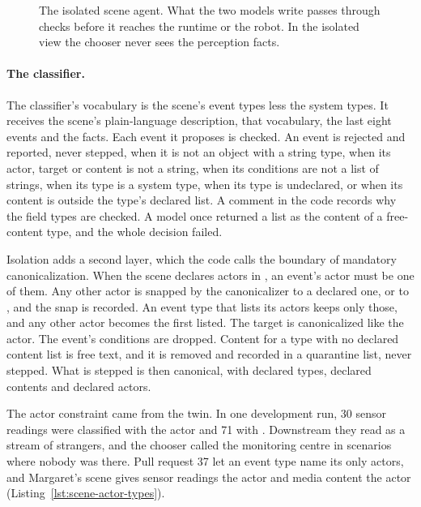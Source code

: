 \begin{figure}[t]
\centering

\caption{The isolated scene agent. What the two models write passes through checks before it
reaches the runtime or the robot. In the isolated view the chooser never sees the perception facts.}
\label{fig:runtime-agent}
\end{figure}

\paragraph{The classifier.}
The classifier's vocabulary is the scene's event types less the system types. It receives the
scene's plain-language description, that vocabulary, the last eight events and the facts. Each
event it proposes is checked. An event is rejected and reported, never stepped, when it is not an
object with a string type, when its actor, target or content is not a string, when its conditions
are not a list of strings, when its type is a system type, when its type is undeclared, or when its
content is outside the type's declared list. A comment in the code records why the field types are
checked. A model once returned a list as the content of a free-content type, and the whole decision
failed.

Isolation adds a second layer, which the code calls the boundary of mandatory canonicalization. When
the scene declares actors in , an event's actor must be one of them. Any other
actor is snapped by the canonicalizer to a declared one, or to , and the snap is
recorded. An event type that
lists its actors keeps only those, and any other actor becomes the first listed. The target is
canonicalized like the actor. The event's conditions are dropped. Content for a type with no
declared content list is free text, and it is removed and recorded in a quarantine list, never
stepped. What is stepped is then canonical, with declared types, declared contents and declared
actors.

The actor constraint came from the twin. In one development run, 30 sensor readings were classified
with the actor  and 71 with . Downstream they read as a stream of
strangers, and the chooser called the monitoring centre in scenarios where nobody was there. Pull
request 37 let an event type name its only actors, and Margaret's scene gives sensor readings the
actor  and media content the actor  (Listing~\ref{lst:scene-actor-types}).

